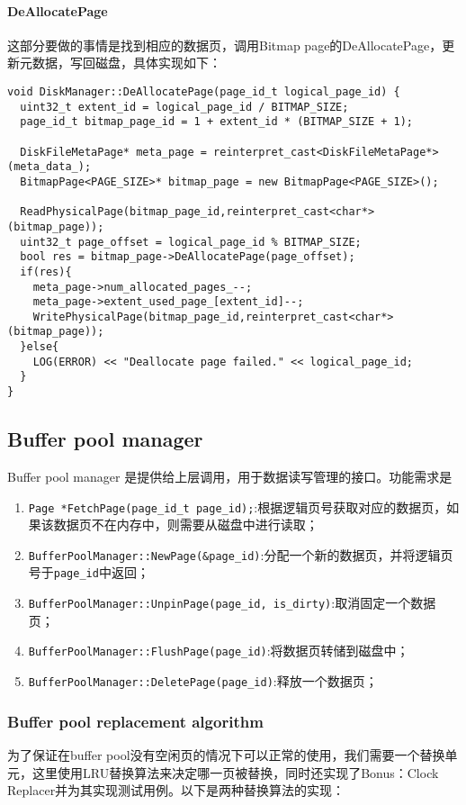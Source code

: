 \documentclass[12pt,hyperref,a4paper,UTF8]{ctexart}
\begin{document}
\paragraph{DeAllocatePage}
这部分要做的事情是找到相应的数据页，调用Bitmap page的DeAllocatePage，更新元数据，写回磁盘，具体实现如下：
\begin{verbatim}
void DiskManager::DeAllocatePage(page_id_t logical_page_id) {
  uint32_t extent_id = logical_page_id / BITMAP_SIZE;
  page_id_t bitmap_page_id = 1 + extent_id * (BITMAP_SIZE + 1);

  DiskFileMetaPage* meta_page = reinterpret_cast<DiskFileMetaPage*>(meta_data_);
  BitmapPage<PAGE_SIZE>* bitmap_page = new BitmapPage<PAGE_SIZE>();

  ReadPhysicalPage(bitmap_page_id,reinterpret_cast<char*>(bitmap_page));
  uint32_t page_offset = logical_page_id % BITMAP_SIZE;
  bool res = bitmap_page->DeAllocatePage(page_offset);
  if(res){
    meta_page->num_allocated_pages_--;
    meta_page->extent_used_page_[extent_id]--;
    WritePhysicalPage(bitmap_page_id,reinterpret_cast<char*>(bitmap_page));
  }else{
    LOG(ERROR) << "Deallocate page failed." << logical_page_id;
  }
}
\end{verbatim}

\subsection{Buffer pool manager}
Buffer pool manager 是提供给上层调用，用于数据读写管理的接口。功能需求是
\begin{enumerate}
    \item \verb|Page *FetchPage(page_id_t page_id);|:根据逻辑页号获取对应的数据页，如果该数据页不在内存中，则需要从磁盘中进行读取；
    \item \verb|BufferPoolManager::NewPage(&page_id)|:分配一个新的数据页，并将逻辑页号于\verb|page_id|中返回；
    \item \verb|BufferPoolManager::UnpinPage(page_id, is_dirty)|:取消固定一个数据页；
    \item \verb|BufferPoolManager::FlushPage(page_id)|:将数据页转储到磁盘中；
    \item \verb|BufferPoolManager::DeletePage(page_id)|:释放一个数据页；
\end{enumerate}

\subsubsection{Buffer pool replacement algorithm}
为了保证在buffer pool没有空闲页的情况下可以正常的使用，我们需要一个替换单元，这里使用LRU替换算法来决定哪一页被替换，同时还实现了Bonus：Clock Replacer并为其实现测试用例。以下是两种替换算法的实现：
\end{document}
